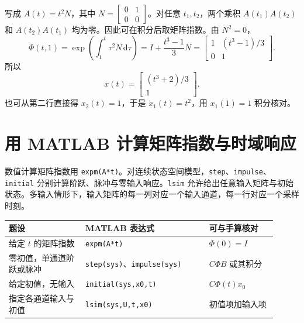 
\sol 写成 $A(t)=t^2N$，其中 $N=\begin{bmatrix}0&1\\0&0\end{bmatrix}$。对任意 $t_1,t_2$，两个乘积 $A(t_1)A(t_2)$ 和 $A(t_2)A(t_1)$ 均为零。因此可在积分后取矩阵指数。由 $N^2=0$，
\[
\Phi(t,1)=\exp\left(\int_1^t\tau^2N\,\mathrm d\tau\right)
=I+\frac{t^3-1}{3}N
=\begin{bmatrix}1&(t^3-1)/3\\0&1\end{bmatrix}.
\]
所以
\[
\boxed{x(t)=\begin{bmatrix}(t^3+2)/3\\1\end{bmatrix}} .
\]
也可从第二行直接得 $x_2(t)=1$，于是 $\dot x_1(t)=t^2$，用 $x_1(1)=1$ 积分核对。

\section{用 MATLAB 计算矩阵指数与时域响应}

数值计算矩阵指数用 \texttt{expm(A*t)}。对连续状态空间模型，\texttt{step}、\texttt{impulse}、\texttt{initial} 分别计算阶跃、脉冲与零输入响应。\texttt{lsim} 允许给出任意输入矩阵与初始状态。多输入情形下，输入矩阵的每一列对应一个输入通道，每一行对应一个采样时刻。

\begin{center}
\small
\begin{tabular}{p{0.26\linewidth}p{0.42\linewidth}p{0.23\linewidth}}
\toprule
题设 & MATLAB 表达式 & 可与手算核对\\
\midrule
给定 $t$ 的矩阵指数 & \texttt{expm(A*t)} & $\Phi(0)=I$\\
零初值，单通道阶跃或脉冲 & \texttt{step(sys)}、\texttt{impulse(sys)} & $C\Phi B$ 或其积分\\
给定初值，无输入 & \texttt{initial(sys,x0,t)} & $C\Phi(t)x_0$\\
指定各通道输入与初值 & \texttt{lsim(sys,U,t,x0)} & 初值项加输入项\\
\bottomrule
\end{tabular}
\end{center}


